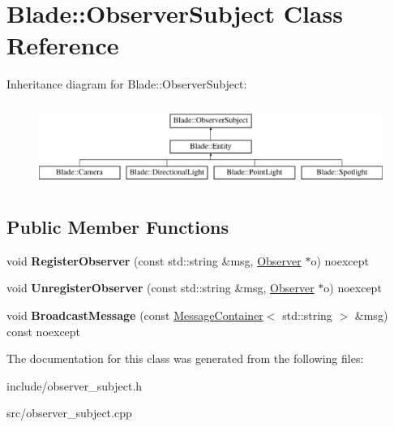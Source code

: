 \hypertarget{class_blade_1_1_observer_subject}{}\section{Blade\+:\+:Observer\+Subject Class Reference}
\label{class_blade_1_1_observer_subject}
Inheritance diagram for Blade\+:\+:Observer\+Subject\+:\begin{figure}[H]
\begin{center}
\leavevmode
\includegraphics[height=2.727273cm]{class_blade_1_1_observer_subject}
\end{center}
\end{figure}
\subsection*{Public Member Functions}
\begin{DoxyCompactItemize}
\item 
\mbox{\label{class_blade_1_1_observer_subject_af8e103e7a7cb33062ea5fbf189902272}} 
void {\bfseries Register\+Observer} (const std\+::string \&msg, \hyperlink{class_blade_1_1_observer}{Observer} $\ast$o) noexcept
\item 
\mbox{\label{class_blade_1_1_observer_subject_a780cc6b90ee1b46fe936a8c712c41a58}} 
void {\bfseries Unregister\+Observer} (const std\+::string \&msg, \hyperlink{class_blade_1_1_observer}{Observer} $\ast$o) noexcept
\item 
\mbox{\label{class_blade_1_1_observer_subject_a4d8b26a245fa28769456e5f54049b86b}} 
void {\bfseries Broadcast\+Message} (const \hyperlink{class_blade_1_1_ref_counted_container}{Message\+Container}$<$ std\+::string $>$ \&msg) const noexcept
\end{DoxyCompactItemize}


The documentation for this class was generated from the following files\+:\begin{DoxyCompactItemize}
\item 
include/observer\+\_\+subject.\+h\item 
src/observer\+\_\+subject.\+cpp\end{DoxyCompactItemize}
